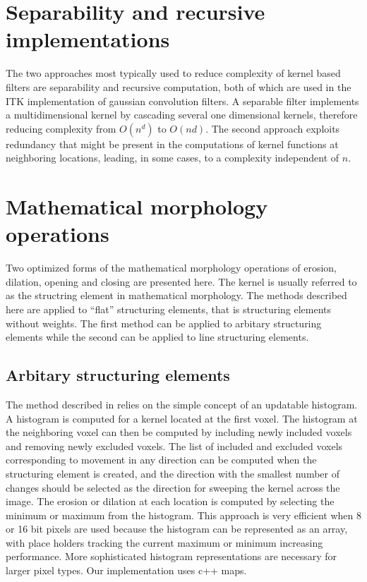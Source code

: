 \documentclass{InsightArticle}
\begin{document}
\section{Separability and recursive implementations}
The two approaches most typically used to reduce complexity of kernel
based filters are separability and recursive computation, both of
which are used in the ITK implementation of gaussian convolution
filters. A separable filter implements a multidimensional kernel by
cascading several one dimensional kernels, therefore reducing
complexity from $O(n^d)$ to $O(nd)$. The second approach exploits
redundancy that might be present in the computations of kernel
functions at neighboring locations, leading, in some cases, to a complexity
independent of $n$.

\section{Mathematical morphology operations}
Two optimized forms of the mathematical morphology operations of
erosion, dilation, opening and closing are presented here. The kernel
is usually referred to as the structring element in mathematical
morphology. The methods described here are applied to ``flat''
structuring elements, that is structuring elements without
weights. The first method can be applied to arbitary structuring
elements while the second can be applied to line structuring elements.

\subsection{Arbitary structuring elements}
\label{sect:MMmovingHist}
The method described in \cite{Vandroogenbroeck96.3} relies on the
simple concept of an updatable histogram. A histogram is computed for
a kernel located at the first voxel. The histogram at the neighboring
voxel can then be computed by including newly included voxels and
removing newly excluded voxels. The list of included and excluded
voxels corresponding to movement in any direction can be computed when
the structuring element is created, and the direction with the
smallest number of changes should be selected as the direction for
sweeping the kernel across the image. The erosion or dilation at each
location is computed by selecting the minimum or maximum from the
histogram. This approach is very efficient when 8 or 16 bit pixels are
used because the histogram can be represented as an array, with place
holders tracking the current maximum or minimum increasing
performance. More sophisticated histogram representations are
necessary for larger pixel types. Our implementation uses c++ maps.
\end{document}
